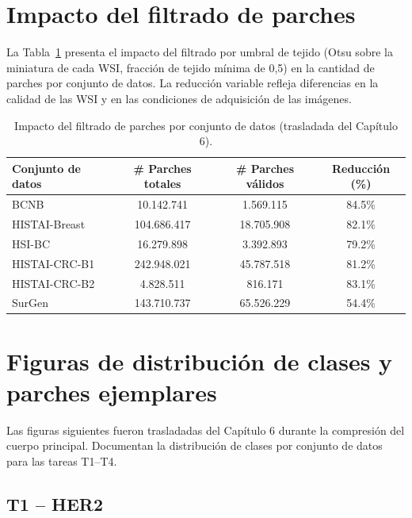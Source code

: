 \section{Impacto del filtrado de parches}
\label{anexo:impacto_filtrado}

La Tabla~\ref{tab:anexo_impacto_filtrado} presenta el impacto del filtrado por umbral de tejido (Otsu sobre la miniatura de cada WSI, fracción de tejido mínima de 0,5) en la cantidad de parches por conjunto de datos. La reducción variable refleja diferencias en la calidad de las WSI y en las condiciones de adquisición de las imágenes.

\begin{table}[htbp]
    \centering
    \caption{Impacto del filtrado de parches por conjunto de datos (trasladada del Capítulo 6).}
    \label{tab:anexo_impacto_filtrado}
    \begin{tabular}{p{3.5cm} c c c}
        \toprule
        \textbf{Conjunto de datos} & \textbf{\# Parches totales} & \textbf{\# Parches válidos} & \textbf{Reducción (\%)} \\
        \midrule
        BCNB & 10.142.741 & 1.569.115 & 84.5\% \\
        HISTAI-Breast & 104.686.417 & 18.705.908 & 82.1\% \\
        HSI-BC & 16.279.898 & 3.392.893 & 79.2\% \\
        HISTAI-CRC-B1 & 242.948.021 & 45.787.518 & 81.2\% \\
        HISTAI-CRC-B2 & 4.828.511 & 816.171 & 83.1\% \\
        SurGen & 143.710.737 & 65.526.229 & 54.4\% \\
        \bottomrule
    \end{tabular}
\end{table}

\section{Figuras de distribución de clases y parches ejemplares}
\label{anexo:figuras_distribucion}

Las figuras siguientes fueron trasladadas del Capítulo 6 durante la compresión del cuerpo principal. Documentan la distribución de clases por conjunto de datos para las tareas T1--T4.

\subsection{T1 -- HER2}

